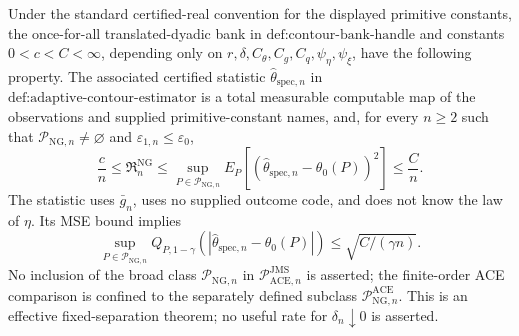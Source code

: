 Under the standard certified-real convention for the displayed primitive constants, the once-for-all translated-dyadic bank in \(\text{def:contour-bank-handle}\) and constants \(0<c<C<\infty\), depending only on \(r,\delta,C_{\theta},C_g,C_q,\psi_{\eta},\psi_{\xi}\), have the following property.  The associated certified statistic \(\widehat\theta_{\mathrm{spec},n}\) in \(\text{def:adaptive-contour-estimator}\) is a total measurable computable map of the observations and supplied primitive-constant names, and, for every \(n\ge2\) such that \(\mathcal P_{\mathrm{NG},n}\neq\varnothing\) and \(\varepsilon_{1,n}\le\varepsilon_0\),
\[
 \frac cn\le\mathfrak R_n^{\mathrm{NG}}
 \le\sup_{P\in\mathcal P_{\mathrm{NG},n}}
 E_P[(\widehat\theta_{\mathrm{spec},n}-\theta_0(P))^2]
 \le\frac Cn.
\]
The statistic uses \(\bar g_n\), uses no supplied outcome code, and does not know the law of \(\eta\).  Its MSE bound implies
\[
 \sup_{P\in\mathcal P_{\mathrm{NG},n}}
 Q_{P,1-\gamma}(|\widehat\theta_{\mathrm{spec},n}-\theta_0(P)|)
 \le\sqrt{C/(\gamma n)}.
\]
No inclusion of the broad class \(\mathcal P_{\mathrm{NG},n}\) in \(\mathcal P_{\mathrm{ACE},n}^{\mathrm{JMS}}\) is asserted; the finite-order ACE comparison is confined to the separately defined subclass \(\mathcal P_{\mathrm{NG},n}^{\mathrm{ACE}}\).  This is an effective fixed-separation theorem; no useful rate for \(\delta_n\downarrow0\) is asserted.
